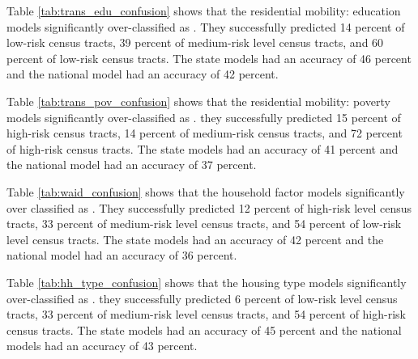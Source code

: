  

Table \ref{tab:trans_edu_confusion} shows that the residential mobility: education models significantly over-classified \cts as \lrl. They successfully predicted 14 percent of low-risk census tracts, 39 percent of medium-risk level census tracts, and  60 percent of low-risk census tracts. The state models had an accuracy of 46 percent and the national model had an accuracy of 42 percent.

 

Table \ref{tab:trans_pov_confusion} shows that the residential mobility: poverty models significantly over-classified \cts as \lrl. they successfully predicted 15 percent of high-risk census tracts, 14 percent of medium-risk census tracts, and 72 percent of high-risk census tracts. The state models had an accuracy of 41 percent and the national model had an accuracy of 37 percent. 

 

Table \ref{tab:waid_confusion} shows that the household factor models significantly over classified \cts as \lrl. They successfully predicted 12 percent of high-risk level census tracts, 33 percent of medium-risk level census tracts, and 54 percent of low-risk level census tracts. The state models had an accuracy of 42 percent and the national model had an accuracy of 36 percent. 



Table \ref{tab:hh_type_confusion} shows that the housing type models significantly over-classified \cts as \lrl. they successfully predicted 6 percent of low-risk level census tracts, 33 percent of medium-risk level census tracts, and 54 percent of high-risk census tracts. The state models had an accuracy of 45 percent and the national models had an accuracy of 43 percent. 









\endinput